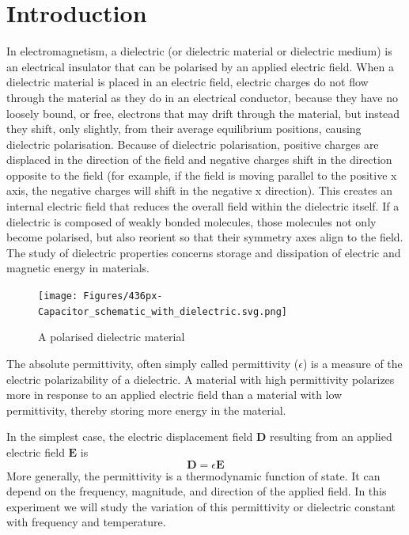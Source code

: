 \documentclass[%
 aip,
 amsmath,amssymb,
 reprint, floatfix%
]{revtex4-1}
\begin{document}
\section{Introduction}
    In electromagnetism, a dielectric (or dielectric material or dielectric medium) is an electrical insulator that can be polarised by an applied electric field. When a dielectric material is placed in an electric field, electric charges do not flow through the material as they do in an electrical conductor, because they have no loosely bound, or free, electrons that may drift through the material, but instead they shift, only slightly, from their average equilibrium positions, causing dielectric polarisation. Because of dielectric polarisation, positive charges are displaced in the direction of the field and negative charges shift in the direction opposite to the field (for example, if the field is moving parallel to the positive x axis, the negative charges will shift in the negative x direction). This creates an internal electric field that reduces the overall field within the dielectric itself. If a dielectric is composed of weakly bonded molecules, those molecules not only become polarised, but also reorient so that their symmetry axes align to the field. The study of dielectric properties concerns storage and dissipation of electric and magnetic energy in materials.
    \begin{figure}
        \centering
        \texttt{[image: Figures/436px-Capacitor\_schematic\_with\_dielectric.svg.png]}
        \caption{A polarised dielectric material}
        \label{fig:dielectric}
    \end{figure}
    \par
    The absolute permittivity, often simply called permittivity ($\epsilon$) is a measure of the electric polarizability of a dielectric. A material with high permittivity polarizes more in response to an applied electric field than a material with low permittivity, thereby storing more energy in the material.
    \par
    In the simplest case, the electric displacement field $\mathbf{D}$ resulting from an applied electric field $\mathbf{E}$ is
    \begin{equation}
        \mathbf{D} = \epsilon \mathbf{E}
    \end{equation}
    More generally, the permittivity is a thermodynamic function of state. It can depend on the frequency, magnitude, and direction of the applied field. In this experiment we will study the variation of this permittivity or dielectric constant with frequency and temperature.
\end{document}
